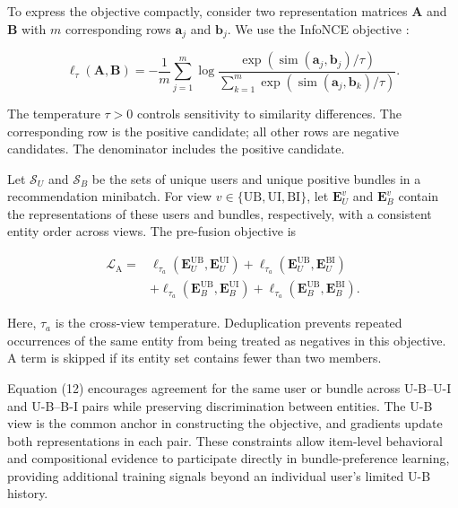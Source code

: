 \documentclass[letterpaper]{article}
\begin{document}
To express the objective compactly, consider two representation matrices $\mathbf A$ and $\mathbf B$ with $m$ corresponding rows $\mathbf a_j$ and $\mathbf b_j$. We use the InfoNCE objective \cite{oord2018cpc}:

\begin{equation}
\ell_\tau(\mathbf A,\mathbf B)
=-\frac{1}{m}\sum_{j=1}^{m}
\log
\frac{\exp(\operatorname{sim}(\mathbf a_j,\mathbf b_j)/\tau)}
{\sum_{k=1}^{m}
\exp(\operatorname{sim}(\mathbf a_j,\mathbf b_k)/\tau)}.
\tag{11}
\end{equation}

The temperature $\tau>0$ controls sensitivity to similarity differences. The corresponding row is the positive candidate; all other rows are negative candidates. The denominator includes the positive candidate.

Let $\mathcal S_U$ and $\mathcal S_B$ be the sets of unique users and unique positive bundles in a recommendation minibatch. For view $v\in\{\mathrm{UB},\mathrm{UI},\mathrm{BI}\}$, let $\mathbf E_U^v$ and $\mathbf E_B^v$ contain the representations of these users and bundles, respectively, with a consistent entity order across views. The pre-fusion objective is

\begin{equation}
\begin{aligned}
\mathcal L_{\mathrm A}
={}&\ell_{\tau_a}(\mathbf E_U^{\mathrm{UB}},\mathbf E_U^{\mathrm{UI}})
+\ell_{\tau_a}(\mathbf E_U^{\mathrm{UB}},\mathbf E_U^{\mathrm{BI}})\\
&+\ell_{\tau_a}(\mathbf E_B^{\mathrm{UB}},\mathbf E_B^{\mathrm{UI}})
+\ell_{\tau_a}(\mathbf E_B^{\mathrm{UB}},\mathbf E_B^{\mathrm{BI}}).
\end{aligned}
\tag{12}
\end{equation}

Here, $\tau_a$ is the cross-view temperature. Deduplication prevents repeated occurrences of the same entity from being treated as negatives in this objective. A term is skipped if its entity set contains fewer than two members.

Equation (12) encourages agreement for the same user or bundle across U-B--U-I and U-B--B-I pairs while preserving discrimination between entities. The U-B view is the common anchor in constructing the objective, and gradients update both representations in each pair. These constraints allow item-level behavioral and compositional evidence to participate directly in bundle-preference learning, providing additional training signals beyond an individual user's limited U-B history.
\end{document}

